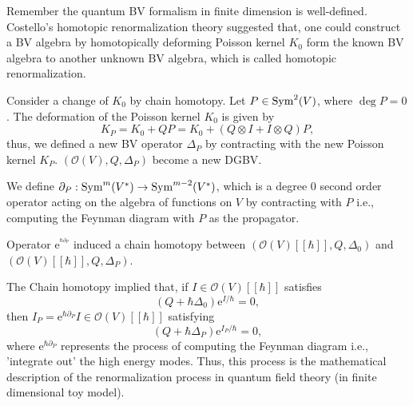 \documentclass[10pt]{article}
\begin{document}
Remember the quantum BV formalism in finite dimension is well-defined.
Costello's homotopic renormalization theory suggested that, one could construct a BV algebra by homotopically deforming Poisson kernel $ K_0$ form the known BV algebra to another unknown BV algebra, which is called homotopic renormalization.

Consider a change of $ K_0$ by chain homotopy.
Let $ P \in \operatorname{Sym}^{2}(V)$, where $\deg P = 0$.
The deformation of the Poisson kernel $ K_0$ is given by
\begin{equation*}
  K_{P} = K_0 + Q P = K_0 + \left( Q \otimes I + I \otimes Q \right) P,
\end{equation*}
thus, we defined a new BV operator $ \Delta_{P}$ by contracting with the new Poisson kernel $ K_{P}$.
$\left( \mathcal{O}(V), Q, \Delta_{P} \right)$ become a new DGBV.

We define $\partial_{P}: \operatorname{Sym}^{m}(V^{*}) \rightarrow \operatorname{Sym}^{m-2}(V^{*})$, which is a degree $ 0$ second order operator acting on the algebra of functions on $ V$ by contracting with $ P$ i.e., computing the Feynman diagram with $ P$ as the propagator.
\begin{proposition}
  Operator $ \mathrm{e}^{^{\hbar \partial_{P}}}$ induced a chain homotopy between $\left( \mathcal{O}(V)[[\hbar]], Q, \Delta_0 \right)$ and $\left( \mathcal{O}(V)[[\hbar]], Q, \Delta_{P} \right)$.
\end{proposition}
The Chain homotopy implied that, if $ I \in \mathcal{O}(V)[[\hbar]]$ satisfies
\begin{equation*}
  (Q + \hbar \Delta_0) \mathrm{e}^{I / \hbar} = 0,
\end{equation*}
then $ I_{P} = \mathrm{e}^{\hbar \partial_{P}} I \in \mathcal{O}(V)[[\hbar]]$ satisfying
\begin{equation*}
  \left( Q + \hbar \Delta_{P} \right) \mathrm{e}^{I_{P} / \hbar} = 0,
\end{equation*}
where $ \mathrm{e}^{\hbar \partial_{P}}$ represents the process of computing the Feynman diagram i.e., 'integrate out' the high energy modes. Thus, this process is the mathematical description of the renormalization process in quantum field theory (in finite dimensional toy model).
\end{document}
